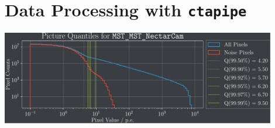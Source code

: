 \section{Data Processing with \texttt{ctapipe}}%
\label{sec:data_processing}

\begin{frame}
    \centering
    \includegraphics[width=0.9\textwidth]{build/quantiles_plot.pdf}
\end{frame}